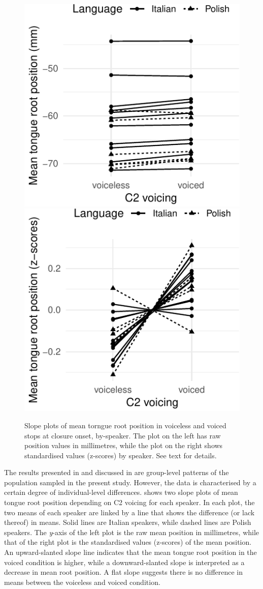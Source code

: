 \documentclass[12pt,]{article}
\begin{document}
\begin{figure}

{\centering \includegraphics[width=.49\linewidth]{2018-tra_files/figure-latex/trp-voicing-plot-1} \includegraphics[width=.49\linewidth]{2018-tra_files/figure-latex/trp-voicing-plot-2} 

}

\caption{Slope plots of mean torngue root position in voiceless and voiced stops at closure onset, by-speaker. The plot on the left has raw position values in millimetres, while the plot on the right shows standardised values (z-scores) by speaker. See text for details.}\label{f:trp-voicing-plot}
\end{figure}

The results presented in  and discussed in
 are group-level patterns of the population sampled
in the present study. However, the data is characterised by a certain
degree of individual-level differences.  shows
two slope plots of mean tongue root position depending on C2 voicing for
each speaker. In each plot, the two means of each speaker are linked by
a line that shows the difference (or lack thereof) in means. Solid lines
are Italian speakers, while dashed lines are Polish speakers. The
\emph{y}-axis of the left plot is the raw mean position in millimetres,
while that of the right plot is the standardised values (z-scores) of
the mean position. An upward-slanted slope line indicates that the mean
tongue root position in the voiced condition is higher, while a
downward-slanted slope is interpreted as a decrease in mean root
position. A flat slope suggests there is no difference in means between
the voiceless and voiced condition.
\end{document}
